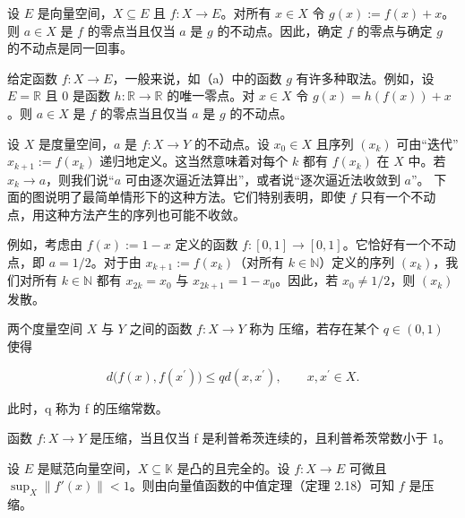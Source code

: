 \begin{remark}

\begin{items}
\item

设 $E$ 是向量空间，$X \subseteq E$ 且 $f: X \to E$。对所有 $x \in X$ 令 $g(x) := f(x) + x$。则 $a \in X$ 是 $f$ 的零点当且仅当 $a$ 是 $g$ 的不动点。因此，确定 $f$ 的零点与确定 $g$ 的不动点是同一回事。

\item

给定函数 $ f: X \to E $，一般来说，如（a）中的函数 $ g $ 有许多种取法。例如，设 $ E = \mathbb{R} $ 且 0 是函数 $ h: \mathbb{R} \to \mathbb{R} $ 的唯一零点。对 $ x \in X $ 令 $ g(x) = h(f(x)) + x $。则 $ a \in X $ 是 $ f $ 的零点当且仅当 $ a $ 是 $ g $ 的不动点。

\item

设 $X$ 是度量空间，$a$ 是 $f: X \to Y$ 的不动点。设 $x_0 \in X$ 且序列 $(x_k)$ 可由“迭代” $x_{k+1} := f(x_k)$ 递归地定义。这当然意味着对每个 $k$ 都有 $f(x_k)$ 在 $X$ 中。若 $x_k \to a$，则我们说“$a$ 可由逐次逼近法算出”，或者说“逐次逼近法收敛到 $a$”。
下面的图说明了最简单情形下的这种方法。它们特别表明，即使 $f$ 只有一个不动点，用这种方法产生的序列也可能不收敛。

\end{items}


例如，考虑由 $f(x):=1-x$ 定义的函数 $f:[0,1]\to[0,1]$。它恰好有一个不动点，即 $a=1/2$。对于由 $x_{k+1}:=f(x_k)$（对所有 $k\in\mathbb{N}$）定义的序列 $(x_k)$，我们对所有 $k\in\mathbb{N}$ 都有 $x_{2k}=x_0$ 与 $x_{2k+1}=1-x_0$。因此，若 $x_0\neq1/2$，则 $(x_k)$ 发散。

两个度量空间 $X$ 与 $Y$ 之间的函数 $f: X \to Y$ 称为 $\text{压缩}$，若存在某个 $q \in (0,1)$ 使得

\[
d\bigl(f(x),f(x^{\prime})\bigr)\leq q d(x,x^{\prime}),\qquad x,x^{\prime}\in X.
\]

此时，q 称为 f 的压缩常数。

\end{remark}

\begin{remark}

\begin{items}
\item

函数 $ f: X \to Y $ 是压缩，当且仅当 f 是利普希茨连续的，且利普希茨常数小于 1。

\item

设 $E$ 是赋范向量空间，$X \subseteq \mathbb{K}$ 是凸的且完全的。设 $f: X \to E$ 可微且 $\sup_X \|f'(x)\| < 1$。则由向量值函数的中值定理（定理 2.18）可知 $f$ 是压缩。

\end{items}

\end{remark}

